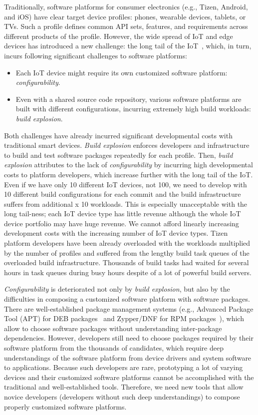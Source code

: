 Traditionally, software platforms for consumer electronics (e.g., Tizen, Android, and iOS) have clear target device profiles: phones, wearable devices, tablets, or TVs.
Such a profile defines common API sets, features, and requirements across different products of the profile.
However, the wide spread of IoT and edge devices has introduced a new challenge: the long tail of the IoT~\cite{1Want2015EnablingTI}, which, in turn, incurs following significant challenges to software platforms:
\begin{itemize}
\item Each IoT device might require its own customized software platform: \textit{configurability}.
\item Even with a shared source code repository, various software platforms are built with different configurations, incurring extremely high build workloads: \textit{build explosion}.
\end{itemize}


Both challenges have already incurred significant developmental costs with traditional smart devices.
\textit{Build explosion} enforces developers and infrastructure to build and test software packages repeatedly for each profile.
Then, \textit{build explosion} attributes to the lack of \textit{configurability} by incurring high developmental costs to platform developers, which increase further with the long tail of the IoT.
Even if we have only 10 different IoT devices, not 100, we need to develop with 10 different build configurations for each commit and the build infrastructure suffers from additional x 10 workloads.
This is especially unacceptable with the long tail-ness; each IoT device type has little revenue although the whole IoT device portfolio may have huge revenue.
We cannot afford linearly increasing development costs with the increasing number of IoT device types.
Tizen platform developers have been already overloaded with the workloads multiplied by the number of profiles and suffered from the lengthy build task queues of the overloaded build infrastructure.
Thousands of build tasks had waited for several hours in task queues during busy hours despite of a lot of powerful build servers.


\textit{Configurability} is deteriorated not only by \textit{build explosion}, but also by the difficulties in composing a customized software platform with software packages.
There are well-established package management systems (e.g., Advanced Package Tool (APT) for DEB packages~\cite{blackman2000debian} and Zypper/DNF for RPM packages~\cite{foster2003red}), which allow to choose software packages without understanding inter-package dependencies.
However, developers still need to choose packages required by their software platform from the thousands of candidates, which require deep understandings of the software platform from device drivers and system software to applications.
Because such developers are rare, prototyping a lot of varying devices and their customized software platforms cannot be accomplished with the traditional and well-established tools.
Therefore, we need new tools that allow novice developers (developers without such deep understandings) to compose properly customized software platforms.


